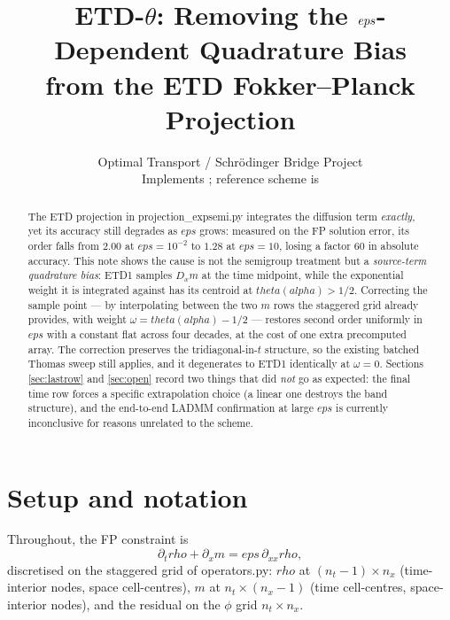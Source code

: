 \documentclass[11pt]{article}
\title{ETD-$\theta$: Removing the $\eps$-Dependent Quadrature Bias\\ from the ETD
Fokker--Planck Projection}
\author{Optimal Transport / Schr\"odinger Bridge Project\\
Implements \code{projection\_expsemi\_theta.py}; reference scheme is
\code{projection\_expsemi.py}}
\date{}
\newcommand{\eps}{\varepsilon}
\newcommand{\dt}{\Delta t}
\newcommand{\dx}{\Delta x}
\newcommand{\code}[1]{\texttt{#1}}
\def\theta{theta}\def\Theta{Theta}\def\alpha{alpha}\def\rho{rho}%
\def\eps{eps}\def\dt{dt}\def\dx{dx}\def\code#1{#1}%
\begin{document}
\maketitle

\begin{abstract}
The ETD projection in \code{projection\_expsemi.py} integrates the diffusion term
\emph{exactly}, yet its accuracy still degrades as $\eps$ grows: measured on the FP
solution error, its order falls from $2.00$ at $\eps=10^{-2}$ to $1.28$ at $\eps=10$,
losing a factor $60$ in absolute accuracy. This note shows the cause is not the
semigroup treatment but a \emph{source-term quadrature bias}: ETD1 samples $D_xm$ at
the time midpoint, while the exponential weight it is integrated against has its
centroid at $\theta(\alpha)>1/2$. Correcting the sample point --- by interpolating
between the two $m$ rows the staggered grid already provides, with weight
$\omega=\theta(\alpha)-1/2$ --- restores second order uniformly in $\eps$ with a
constant flat across four decades, at the cost of one extra precomputed array. The
correction preserves the tridiagonal-in-$t$ structure, so the existing batched Thomas
sweep still applies, and it degenerates to ETD1 identically at $\omega=0$. Sections
\ref{sec:lastrow} and \ref{sec:open} record two things that did \emph{not} go as
expected: the final time row forces a specific extrapolation choice (a linear one
destroys the band structure), and the end-to-end LADMM confirmation at large $\eps$ is
currently inconclusive for reasons unrelated to the scheme.
\end{abstract}

\tableofcontents

\section{Setup and notation}

Throughout, the FP constraint is
\begin{equation}
  \partial_t\rho + \partial_x m = \eps\,\partial_{xx}\rho,
  \label{eq:fp}
\end{equation}
discretised on the staggered grid of \code{operators.py}: $\rho$ at $(n_t-1)\times n_x$
(time-interior nodes, space cell-centres), $m$ at $n_t\times(n_x-1)$ (time cell-centres,
space-interior nodes), and the residual on the $\phi$ grid $n_t\times n_x$.
\end{document}
